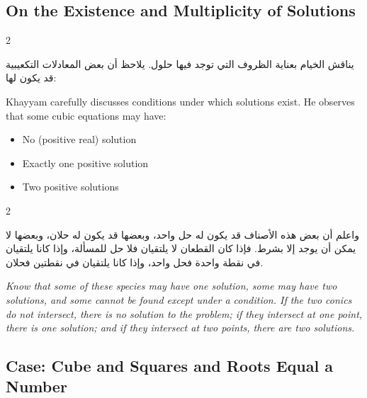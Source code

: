 \documentclass[11pt,a4paper]{book}
\begin{document}
\subsection{On the Existence and Multiplicity of Solutions}
\label{subsec:existence}

\begin{paracol}{2}

\begin{Arabic}
يناقش الخيام بعناية الظروف التي توجد فيها حلول. يلاحظ أن بعض المعادلات التكعيبية قد يكون لها:
\end{Arabic}

\switchcolumn

Khayyam carefully discusses conditions under which solutions exist. He observes that some cubic equations may have:

\end{paracol}

\begin{itemize}[noitemsep]
\item No (positive real) solution
\item Exactly one positive solution
\item Two positive solutions
\end{itemize}

\begin{paracol}{2}

\begin{Arabic}
واعلم أن بعض هذه الأصناف قد يكون له حل واحد، وبعضها قد يكون له حلان، وبعضها لا يمكن أن يوجد إلا بشرط. فإذا كان القطعان لا يلتقيان فلا حل للمسألة، وإذا كانا يلتقيان في نقطة واحدة فحل واحد، وإذا كانا يلتقيان في نقطتين فحلان.
\end{Arabic}

\switchcolumn

\textit{Know that some of these species may have one solution, some may have two solutions, and some cannot be found except under a condition. If the two conics do not intersect, there is no solution to the problem; if they intersect at one point, there is one solution; and if they intersect at two points, there are two solutions.}

\end{paracol}

\subsection{Case: Cube and Squares and Roots Equal a Number}
\label{subsec:case25}
\end{document}
